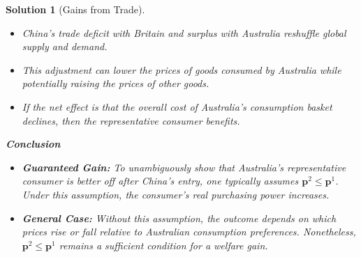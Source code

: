 \documentclass[a4paper,12pt]{article} %
\theoremstyle{nonitalic}
\newtheorem{solution}{Solution}
\begin{document}
\begin{solution}[Gains from Trade]
    \begin{itemize}
        \item China's trade deficit with Britain and surplus with Australia reshuffle global supply and demand.
        \item This adjustment can lower the prices of goods consumed by Australia while potentially raising the prices of other goods.
        \item If the net effect is that the overall cost of Australia’s consumption basket declines, then the representative consumer benefits.
    \end{itemize}
    \textbf{Conclusion}
    \begin{itemize}
        \item \textbf{Guaranteed Gain:} To unambiguously show that Australia’s representative consumer is better off after China’s entry, one typically assumes $\mathbf{p}^2 \le \mathbf{p}^1$. Under this assumption, the consumer’s real purchasing power increases.
        \item \textbf{General Case:} Without this assumption, the outcome depends on which prices rise or fall relative to Australian consumption preferences. Nonetheless, $\mathbf{p}^2 \le \mathbf{p}^1$ remains a sufficient condition for a welfare gain.
    \end{itemize}


\end{solution}
\end{document}
